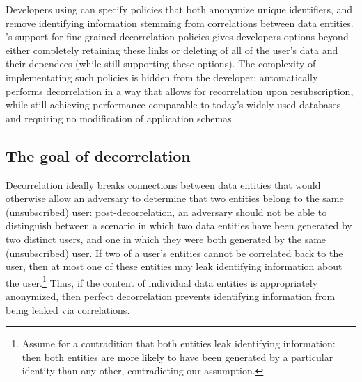 Developers using \sys{} can specify policies that both anonymize unique identifiers, and remove
identifying information stemming from correlations between data entities. \sys{}'s support for
fine-grained decorrelation policies gives developers options beyond either completely retaining
these links or deleting of all of the user's data and their dependees (while still supporting
these options). The complexity of implementating such policies is hidden from the developer:
\sys{} automatically performs decorrelation in a way that allows for recorrelation upon
resubscription, while still achieving performance comparable to today’s widely-used databases and
requiring no modification of application schemas. 

\subsection{The goal of decorrelation}
Decorrelation ideally breaks connections between data entities that would otherwise allow
an adversary to determine that two entities belong to the same (unsubscribed) user:
post-decorrelation, an adversary should not be able to distinguish between a scenario in which two data entities
have been generated by two distinct users, and one in which they were both generated by the same
(unsubscribed) user.  If two of a user's entities cannot be correlated back to the user, then at
most one of these entities may leak identifying information about the user.\footnote{Assume for a
contradition that both entities leak identifying information: then both entities are more likely to
have been generated by a particular identity than any other, contradicting our assumption.}  Thus,
if the content of individual data entities is appropriately anonymized, then perfect decorrelation prevents
identifying information from being leaked via correlations.


